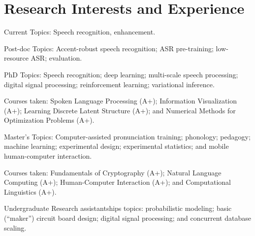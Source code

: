 \documentclass{article}
\begin{document}
\section{Research Interests and Experience}
\begin{CV}
  \item[Current] Topics: Speech recognition, enhancement.

  \item[Post-doc] Topics: Accent-robust speech recognition; ASR pre-training;
    low-resource ASR; evaluation.

  \item[PhD] Topics: Speech recognition; deep learning; multi-scale
    speech processing; digital signal processing; reinforcement learning;
    variational inference.

    Courses taken: Spoken Language Processing (A+);
    Information Visualization (A+);
    Learning Discrete Latent Structure (A+);
    and Numerical Methods for Optimization Problems (A+).

  \item[Master's] Topics: Computer-assisted pronunciation training;
    phonology; pedagogy; machine learning; experimental design; experimental
    statistics; and mobile human-computer interaction.

    Courses taken: Fundamentals of Cryptography (A+); Natural Language
    Computing (A+); Human-Computer Interaction (A+); and Computational
    Linguistics (A+).

  \item[Undergraduate] Research assistantships topics: probabilistic modeling;
    basic (``maker'') circuit board design; digital signal processing; and
    concurrent database scaling.

\end{CV}
\end{document}
